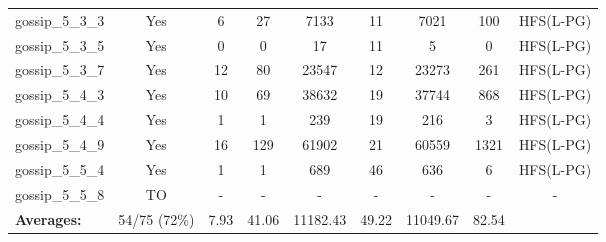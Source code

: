 \documentclass{article}
\begin{document}
\begin{tabular}{lcccccccc}
gossip\_5\_3\_3 & Yes & 6 & 27 & 7133 & 11 & 7021 & 100 & HFS(L-PG) \\
gossip\_5\_3\_5 & Yes & 0 & 0 & 17 & 11 & 5 & 0 & HFS(L-PG) \\
gossip\_5\_3\_7 & Yes & 12 & 80 & 23547 & 12 & 23273 & 261 & HFS(L-PG) \\
gossip\_5\_4\_3 & Yes & 10 & 69 & 38632 & 19 & 37744 & 868 & HFS(L-PG) \\
gossip\_5\_4\_4 & Yes & 1 & 1 & 239 & 19 & 216 & 3 & HFS(L-PG) \\
gossip\_5\_4\_9 & Yes & 16 & 129 & 61902 & 21 & 60559 & 1321 & HFS(L-PG) \\
gossip\_5\_5\_4 & Yes & 1 & 1 & 689 & 46 & 636 & 6 & HFS(L-PG) \\
gossip\_5\_5\_8 & TO & - & - & - & - & - & - & - \\
\textbf{Averages:} & 54/75 (72\%) & 7.93 & 41.06 & 11182.43 & 49.22 & 11049.67 & 82.54 & \\
\bottomrule
\end{tabular}
\\[0.7cm]
\end{document}
